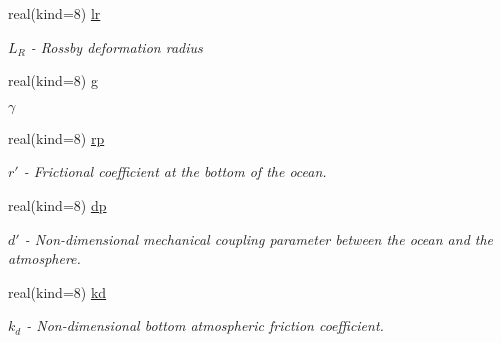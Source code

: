 \begin{DoxyCompactItemize}
\mbox{\label{structparams_1_1physicsconfiguration_ad3c11e04313d5b32c7ecde4d56a65b4d}} 
real(kind=8) \hyperlink{structparams_1_1physicsconfiguration_ad3c11e04313d5b32c7ecde4d56a65b4d}{lr}
\begin{DoxyCompactList}\small\item\em $L_R$ -\/ Rossby deformation radius \end{DoxyCompactList}\item 
\mbox{\label{structparams_1_1physicsconfiguration_a46d66b1586db8cad8c365bec4fb66e59}} 
real(kind=8) \hyperlink{structparams_1_1physicsconfiguration_a46d66b1586db8cad8c365bec4fb66e59}{g}
\begin{DoxyCompactList}\small\item\em $\gamma$ \end{DoxyCompactList}\item 
\mbox{\label{structparams_1_1physicsconfiguration_a1bf613c3539c3c79020d076dbd82bcf7}} 
real(kind=8) \hyperlink{structparams_1_1physicsconfiguration_a1bf613c3539c3c79020d076dbd82bcf7}{rp}
\begin{DoxyCompactList}\small\item\em $r'$ -\/ Frictional coefficient at the bottom of the ocean. \end{DoxyCompactList}\item 
\mbox{\label{structparams_1_1physicsconfiguration_addee7590d526ca0c0b3f02a57b185114}} 
real(kind=8) \hyperlink{structparams_1_1physicsconfiguration_addee7590d526ca0c0b3f02a57b185114}{dp}
\begin{DoxyCompactList}\small\item\em $d'$ -\/ Non-\/dimensional mechanical coupling parameter between the ocean and the atmosphere. \end{DoxyCompactList}\item 
\mbox{\label{structparams_1_1physicsconfiguration_ac93c622b37152b5abcdf1415f05b21d9}} 
real(kind=8) \hyperlink{structparams_1_1physicsconfiguration_ac93c622b37152b5abcdf1415f05b21d9}{kd}
\begin{DoxyCompactList}\small\item\em $k_d$ -\/ Non-\/dimensional bottom atmospheric friction coefficient. \end{DoxyCompactList}\item 

\end{DoxyCompactItemize}
